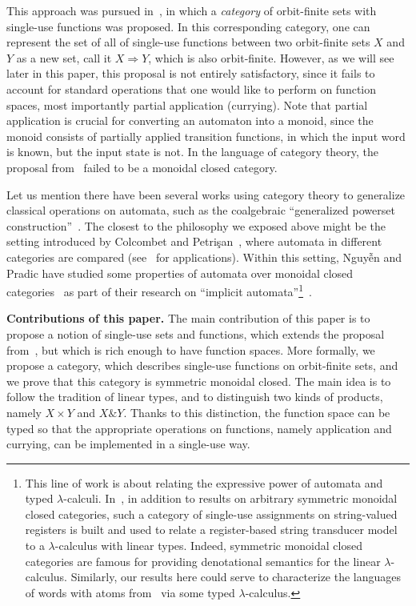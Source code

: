 This approach was pursued in~\cite{stefanski-phd}, in which a \emph{category} of orbit-finite sets with single-use functions was proposed. In this corresponding category,  one can represent the set of all of single-use functions between two orbit-finite sets $X$ and $Y$ as a new set, call it $X \Rightarrow Y$, which is  also orbit-finite.  However, as we will see later in this paper, this proposal is not entirely satisfactory, since it fails to account for standard operations that one would like to perform on function spaces, most importantly partial application (currying). Note that partial application is crucial for converting an automaton into a monoid, since the monoid consists of partially applied transition functions, in which the input word is known, but the input state is not. In the language of category theory, the proposal from~\cite{stefanski-phd} failed to be a monoidal closed category.

Let us mention there have been several works using category theory to generalize classical operations on automata, such as the coalgebraic ``generalized powerset construction''~\cite{DBLP:journals/corr/abs-1302-1046}. The closest to the philosophy we exposed above might be the setting introduced by Colcombet and Petrişan~\cite{colcombet2020automata}, where automata in different categories are compared (see~\cite{ColcombetPS21,Aristote24} for applications). Within this setting, Nguy{\~{ê}}n and Pradic have studied some properties of automata over monoidal closed categories~\cite[Sections~1.2.3~and~4.7--4.8]{titoPhD} as part of their research on ``implicit automata''\footnote{\label{ftn:iatlc}This line of work is about relating the expressive power of automata and typed $\lambda$-calculi. In~\cite{IATLC2,titoPhD}, in addition to results on arbitrary symmetric monoidal closed categories, such a category of single-use assignments on string-valued registers is built and used to relate a register-based string transducer model to a $\lambda$-calculus with linear types. Indeed, symmetric monoidal closed categories are famous for providing denotational semantics for the linear $\lambda$-calculus. Similarly, our results here could serve to characterize the languages of words with atoms from~\cite{bojanczykstefanski2020} via some typed $\lambda$-calculus.}~\cite{IATLC,IATLC2,titoPhD}.

 \textbf{Contributions of this paper.}
The main contribution of this paper is to propose a notion of single-use sets and functions, which extends the proposal from~\cite{stefanski-phd}, but which is rich enough to have function spaces. More formally, we propose a category, which describes single-use functions on orbit-finite sets, and we prove that this category is symmetric monoidal closed. 
The main idea is to follow the tradition of linear types, and to  distinguish two kinds of products, namely $X \times Y$ and $X \& Y$. Thanks to this distinction, the function space can be typed so that the appropriate operations on functions, namely application and currying, can be implemented in a single-use way. 

